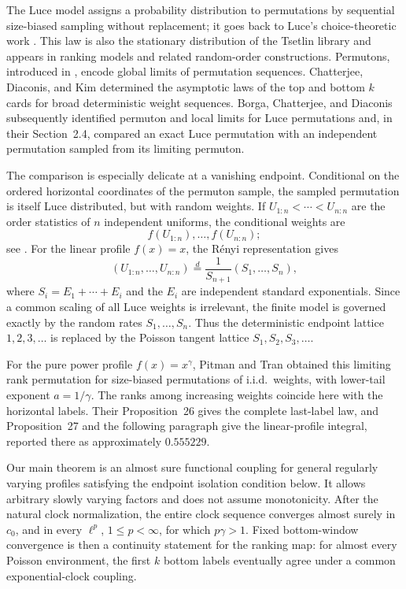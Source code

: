 \documentclass[11pt]{article}
\numberwithin{equation}{section}
\theoremstyle{definition}
\theoremstyle{remark}
\begin{document}
The Luce model assigns a probability distribution to permutations by sequential size-biased sampling without replacement; it goes back to Luce's choice-theoretic work \cite{Luce}.  This law is also the stationary distribution of the Tsetlin library and appears in ranking models and related random-order constructions.  Permutons, introduced in \cite{HKMRS}, encode global limits of permutation sequences.  Chatterjee, Diaconis, and Kim \cite{CDK} determined the asymptotic laws of the top and bottom $k$ cards for broad deterministic weight sequences.  Borga, Chatterjee, and Diaconis \cite{BCD} subsequently identified permuton and local limits for Luce permutations and, in their Section~2.4, compared an exact Luce permutation with an independent permutation sampled from its limiting permuton.

The comparison is especially delicate at a vanishing endpoint.  Conditional on the ordered horizontal coordinates of the permuton sample, the sampled permutation is itself Luce distributed, but with random weights.  If $U_{1:n}<\cdots<U_{n:n}$ are the order statistics of $n$ independent uniforms, the conditional weights are
\[
  f(U_{1:n}),\ldots,f(U_{n:n});
\]
see \cite[Proposition~2.2]{BCD}.  For the linear profile $f(x)=x$, the R\'enyi representation gives
\[
  (U_{1:n},\ldots,U_{n:n})
  \stackrel{d}{=}
  \frac{1}{S_{n+1}}(S_1,\ldots,S_n),
\]
where $S_i=E_1+\cdots+E_i$ and the $E_i$ are independent standard exponentials.  Since a common scaling of all Luce weights is irrelevant, the finite model is governed exactly by the random rates $S_1,\ldots,S_n$.  Thus the deterministic endpoint lattice $1,2,3,\ldots$ is replaced by the Poisson tangent lattice $S_1,S_2,S_3,\ldots$.

For the pure power profile $f(x)=x^\gamma$, Pitman and Tran \cite[Theorem~25]{PitmanTran} obtained this limiting rank permutation for size-biased permutations of i.i.d.\ weights, with lower-tail exponent $a=1/\gamma$.  The ranks among increasing weights coincide here with the horizontal labels.  Their Proposition~26 gives the complete last-label law, and Proposition~27 and the following paragraph give the linear-profile integral, reported there as approximately $0.555229$.

Our main theorem is an almost sure functional coupling for general regularly varying profiles satisfying the endpoint isolation condition below.  It allows arbitrary slowly varying factors and does not assume monotonicity.  After the natural clock normalization, the entire clock sequence converges almost surely in $c_0$, and in every $\ell^p$, $1\leq p<\infty$, for which $p\gamma>1$.  Fixed bottom-window convergence is then a continuity statement for the ranking map: for almost every Poisson environment, the first $k$ bottom labels eventually agree under a common exponential-clock coupling.
\end{document}
